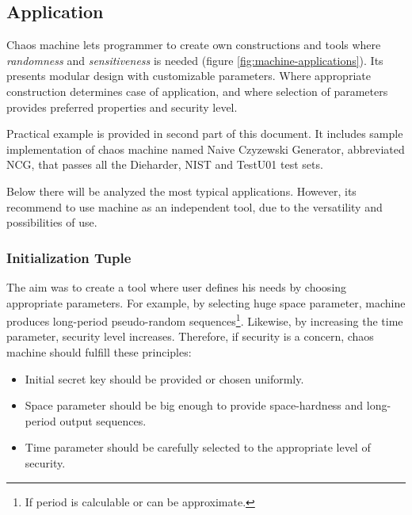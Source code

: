 \documentclass[twocolumn, a4paper, 10pt]{article}
\begin{document}

\subsection{Application}

Chaos machine lets programmer to create own constructions and tools where \textit{randomness} and \textit{sensitiveness} is needed (figure \ref{fig:machine-applications}). Its presents modular design with customizable parameters. Where appropriate construction determines case of application, and where selection of parameters provides preferred properties and security level.

Practical example is provided in second part of this document. It includes sample implementation of chaos machine named Naive Czyzewski Generator, abbreviated NCG, that passes all the Dieharder, NIST and TestU01 test sets.

Below there will be analyzed the most typical applications. However, its recommend to use machine as an independent tool, due to the versatility and possibilities of use.

\subsubsection{Initialization Tuple}

The aim was to create a tool where user defines his needs by choosing appropriate parameters. For example, by selecting huge space parameter, machine produces long-period pseudo-random sequences\footnote{If period is calculable or can be approximate.}. Likewise, by increasing the time parameter, security level increases. Therefore, if security is a concern, chaos machine should fulfill these principles:

\begin{itemize}

\item Initial secret key should be provided or chosen uniformly.

\item Space parameter should be big enough to provide space-hardness and long-period output sequences.

\item Time parameter should be carefully selected to the appropriate level of security.

\end{itemize}
\end{document}
